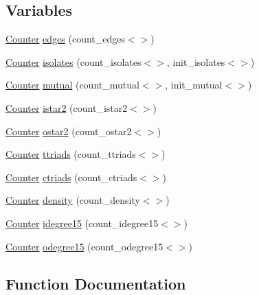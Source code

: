 \subsection*{Variables}
\begin{DoxyCompactItemize}
\item 
\hyperlink{class_counter}{Counter} \hyperlink{namespacenetwork_a7a0da6f5fe0074f5e85bd1ba47be8dd3}{edges} (count\+\_\+edges$<$$>$)
\item 
\hyperlink{class_counter}{Counter} \hyperlink{namespacenetwork_aeb04b242d2e5a69e7d9bfd2f32942e84}{isolates} (count\+\_\+isolates$<$$>$, init\+\_\+isolates$<$$>$)
\item 
\hyperlink{class_counter}{Counter} \hyperlink{namespacenetwork_af7c6b60d469c6e5ffeab54921348559f}{mutual} (count\+\_\+mutual$<$$>$, init\+\_\+mutual$<$$>$)
\item 
\hyperlink{class_counter}{Counter} \hyperlink{namespacenetwork_a74894f9f1d7622157302ea78900c4588}{istar2} (count\+\_\+istar2$<$$>$)
\item 
\hyperlink{class_counter}{Counter} \hyperlink{namespacenetwork_a7cfef2b0af2906a409488cb829297efe}{ostar2} (count\+\_\+ostar2$<$$>$)
\item 
\hyperlink{class_counter}{Counter} \hyperlink{namespacenetwork_ad77db655dd3871b9b12e16ec46c49625}{ttriads} (count\+\_\+ttriads$<$$>$)
\item 
\hyperlink{class_counter}{Counter} \hyperlink{namespacenetwork_a14c788e09059af3894c8cb3bd38d54d9}{ctriads} (count\+\_\+ctriads$<$$>$)
\item 
\hyperlink{class_counter}{Counter} \hyperlink{namespacenetwork_a0a7973963f42fa84d8ad03f072084f97}{density} (count\+\_\+density$<$$>$)
\item 
\hyperlink{class_counter}{Counter} \hyperlink{namespacenetwork_a34a34c9d4268fc69f8a6b3bd85d04cb9}{idegree15} (count\+\_\+idegree15$<$$>$)
\item 
\hyperlink{class_counter}{Counter} \hyperlink{namespacenetwork_abed29a2d0af7a333b4ce60f4dcce9536}{odegree15} (count\+\_\+odegree15$<$$>$)
\end{DoxyCompactItemize}


\subsection{Function Documentation}
\mbox{\label{namespacenetwork_a52e5467dc2136f576b9c24e68ce5bb69}} 
